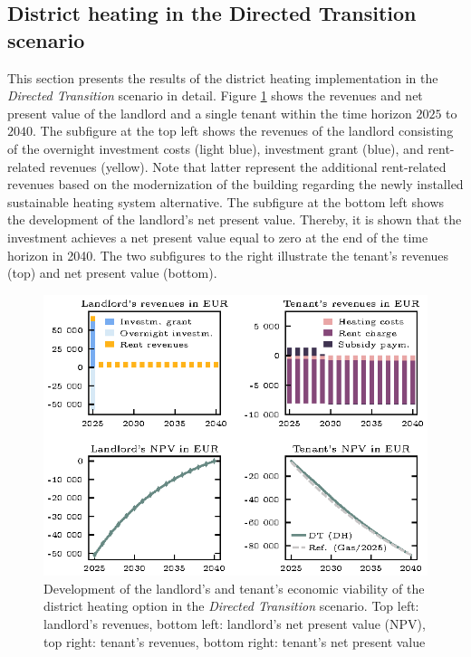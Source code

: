 \subsection{District heating in the Directed Transition scenario}\label{res:district_heating}
This section presents the results of the district heating implementation in the \textit{Directed Transition} scenario in detail. Figure \ref{fig:dt+dh} shows the revenues and net present value of the landlord and a single tenant within the time horizon $2025$ to $2040$. The subfigure at the top left shows the revenues of the landlord consisting of the overnight investment costs (light blue), investment grant (blue), and rent-related revenues (yellow). Note that latter represent the additional rent-related revenues based on the modernization of the building regarding the newly installed sustainable heating system alternative. The subfigure at the bottom left shows the development of the landlord's net present value. Thereby, it is shown that the investment achieves a net present value equal to zero at the end of the time horizon in 2040. The two subfigures to the right illustrate the tenant's revenues (top) and net present value (bottom). 

\begin{figure}[h]
	\centering
	\includegraphics[width=0.9\linewidth]{figures/4_Results/fig_DT_DH/detail.eps}
	\caption{Development of the landlord's and tenant's economic viability of the district heating option in the \textit{Directed Transition} scenario. Top left: landlord's revenues, bottom left: landlord's net present value (NPV), top right: tenant's revenues, bottom right: tenant's net present value}
	\label{fig:dt+dh}
\end{figure}


